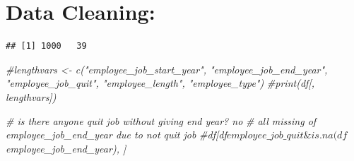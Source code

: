 \documentclass[
]{article}
\newenvironment{Shaded}{\begin{snugshade}}{\end{snugshade}}
\newcommand{\AttributeTok}[1]{\textcolor[rgb]{0.13,0.29,0.53}{#1}}
\newcommand{\CommentTok}[1]{\textcolor[rgb]{0.56,0.35,0.01}{\textit{#1}}}
\newcommand{\ConstantTok}[1]{\textcolor[rgb]{0.56,0.35,0.01}{#1}}
\newcommand{\FunctionTok}[1]{\textcolor[rgb]{0.13,0.29,0.53}{\textbf{#1}}}
\newcommand{\NormalTok}[1]{#1}
\newcommand{\OtherTok}[1]{\textcolor[rgb]{0.56,0.35,0.01}{#1}}
\newcommand{\SpecialCharTok}[1]{\textcolor[rgb]{0.81,0.36,0.00}{\textbf{#1}}}
\newcommand{\StringTok}[1]{\textcolor[rgb]{0.31,0.60,0.02}{#1}}
\begin{document}
\section{Data Cleaning:}\label{data-cleaning}

\begin{Shaded}
\end{Shaded}

\begin{verbatim}
## [1] 1000   39
\end{verbatim}

\begin{Shaded}
\begin{Highlighting}[]
\CommentTok{\#lengthvars \textless{}{-} c("employee\_job\_start\_year", "employee\_job\_end\_year", "employee\_job\_quit", "employee\_length", "employee\_type")}
\CommentTok{\#print(df[, lengthvars])}

\CommentTok{\# is there anyone quit job without giving end year? no}
\CommentTok{\# all missing of employee\_job\_end\_year due to not quit job}
\CommentTok{\#df[df$employee\_job\_quit \& is.na(df$employee\_job\_end\_year), ]}
\end{Highlighting}
\end{Shaded}
\end{document}
